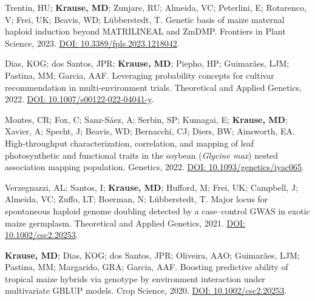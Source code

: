 \documentclass[]{mdkrause_cv_openfont}
\begin{document}
\begin{minipage}[t]{1\textwidth} 


Trentin, HU; \textbf{Krause, MD}; Zunjare, RU; Almeida, VC; Peterlini, E; Rotarenco, V; Frei, UK; Beavis, WD; Lübberstedt, T. Genetic basis of maize maternal haploid induction beyond MATRILINEAL and ZmDMP. Frontiers in Plant Science, 2023. \href{https://frontiersin.org/journals/plant-science/articles/10.3389/fpls.2023.1218042/full}{DOI: 10.3389/fpls.2023.1218042}. \ExternalLink

\sectionsep

Dias, KOG; dos Santos, JPR; \textbf{Krause, MD}; Piepho, HP; Guimarães, LJM; Pastina, MM; Garcia, AAF. Leveraging probability concepts for cultivar recommendation in multi-environment trials. Theoretical and Applied Genetics, 2022. \href{https://link.springer.com/article/10.1007/s00122-022-04041-y}{DOI: 10.1007/s00122-022-04041-y}. \ExternalLink 

\sectionsep
Montes, CR; Fox, C; Sanz-Sáez, A; Serbin, SP; Kumagai, E; \textbf{Krause, MD}; Xavier, A; Specht, J; Beavis, WD; Bernacchi, CJ; Diers, BW; Ainsworth, EA. High-throughput characterization, correlation, and mapping of leaf photosynthetic and functional traits in the soybean (\textit{Glycine max}) nested association mapping population. Genetics, 2022. \href{https://academic.oup.com/genetics/advance-article/doi/10.1093/genetics/iyac065/6572345?login=true}{DOI: 10.1093/genetics/iyac065}. \ExternalLink

\sectionsep
Verzegnazzi, AL; Santos, I; \textbf{Krause, MD}; Hufford, M; Frei, UK; Campbell, J; Almeida, VC; Zuffo, LT; Boerman, N; Lübberstedt, T. Major locus for spontaneous haploid genome doubling detected by a case–control GWAS in exotic maize germplasm. Theoretical and Applied Genetics, 2021. \href{https://link.springer.com/article/10.1007/s00122-021-03780-8}{DOI: 10.1002/csc2.20253}. \ExternalLink 

\sectionsep
\textbf{Krause, MD}; Dias, KOG; dos Santos, JPR; Oliveira, AAO; Guimarães, LJM; Pastina, MM; Margarido, GRA; Garcia, AAF. Boosting predictive ability of tropical maize hybrids via genotype by environment interaction under multivariate GBLUP models. Crop Science, 2020. \href{https://acsess.onlinelibrary.wiley.com/doi/full/10.1002/csc2.20253}{DOI: 10.1002/csc2.20253}. \ExternalLink 

\sectionsep


\end{minipage}
\end{document}
